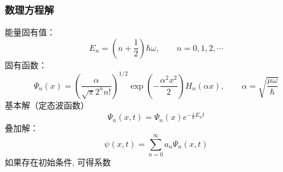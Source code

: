 %
%
\begin{frame}
  \frametitle{数理方程解} 
  能量固有值：
  \[E_n = (n+\frac{1}{2})\hbar \omega, \qquad  n=0,1,2,\cdots  \]
  固有函数：
  \begin{equation*}
	  \Psi_n(x) = \left( \frac{\alpha}{\sqrt{\pi} 2^n n!}  \right) ^{1/2}  \exp(-\frac{ \alpha^2 x^2}{2} ) H_n( \alpha x) , \qquad  \alpha = \sqrt{\frac{\mu\omega}{\hbar}} 
  \end{equation*}
  基本解（定态波函数）
  \begin{equation*}
	  \Psi_n(x,t) = \Psi_n(x) e^{-\frac{i}{\hbar} E_n t} 
  \end{equation*}
  叠加解：
	\[\psi (x,t) = \sum_{n=0} ^{\infty} a_n\Psi_n (x,t) \]
	如果存在初始条件, 可得系数
\end{frame} 

